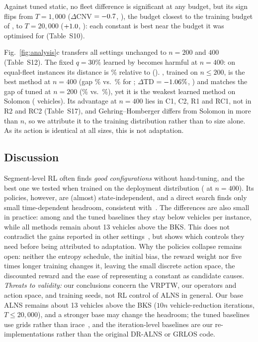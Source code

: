 Against tuned static, no fleet difference is significant at any budget, but its sign
flips from $T=1{,}000$ ($\Delta$CNV $=-0.7{}$, \rbudShortpNVt{}), the budget
closest to the training budget of \sgalns{}, to $T=20{,}000$ ($+1.0{}$,
\rbudLongpNVt{}): each constant is best near the budget it was optimised for
(Table~S10). %

Fig.~\ref{fig:analysis}c transfers all settings unchanged to $n=200$ and $400$
(Table~S12). The fixed $q=30\%$ learned by \sgalns{} becomes harmful at $n=400$: on
equal-fleet instances its distance is \rbigSgdTD{}\% relative to \Rw{}
(\rbigSgpTDt{}). \sgc{}, trained on $n\le200$, is the best method at $n=400$ (gap
\xhgGapCtxEAA{}\% vs.\ \xhgGapRwEAA{}\% for \Rw{}; $\Delta$TD $=-1.06{}\%$,
\rbigCtxpTDt{}) and matches the gap of tuned \Rw{} at $n=200$ (\xhgGapCtxCAA{}\% vs.\
\xhgGapRwtCAA{}\%), yet it is the weakest learned method on Solomon (\xcnvCtx{}
vehicles). Its advantage at $n=400$ lies in C1, C2, R1 and RC1, not in R2 and RC2 (Table~S17), and
Gehring--Homberger differs from Solomon in more than $n$, so we attribute it to the
training distribution rather than to size alone. As its action is identical at all
sizes, this is not adaptation. %

\subsection{Discussion}\label{sec:discussion}
Segment-level RL often finds \emph{good configurations} without hand-tuning, and the
best one we tested when trained on the deployment distribution (\sgc{} at $n=400$).
Its policies, however, are (almost) state-independent, and a direct search finds only
small time-dependent headroom, consistent with~\cite{turkes2021meta}. The differences are also small in practice:
among \sgalns{} and the tuned baselines they stay below \rdeltaNV{} vehicles per
instance, while all methods remain about 13 vehicles above the BKS. This does not
contradict the gains reported in other settings~\cite{kallestad2023,reijnen2024,johnn2024grlos,wang2025ppoalns},
but shows which controls they need before being attributed to adaptation. Why the
policies collapse remains open: neither the entropy schedule, the initial bias, the
reward weight nor five times longer training changes it, leaving the small discrete action space, the discounted
reward and the ease of representing a constant as candidate causes. %
\emph{Threats to validity:} our
conclusions concern the VRPTW, our operators and action space, and \rseedN{} training
seeds, not RL control of ALNS in general. Our base ALNS remains about 13 vehicles above
the BKS ($10n$ vehicle-reduction iterations, $T\le20{,}000$), and a stronger base may
change the headroom; the tuned baselines use grids rather than
irace~\cite{lopez2016irace}, and the iteration-level baselines are our re-implementations
rather than the original DR-ALNS or GRLOS code.
